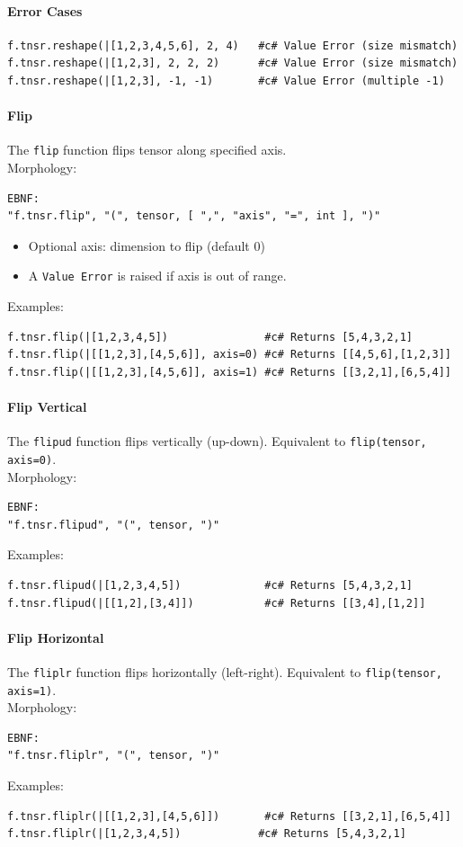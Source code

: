 \paragraph{Error Cases}
\begin{verbatim}
f.tnsr.reshape(|[1,2,3,4,5,6], 2, 4)   #c# Value Error (size mismatch)
f.tnsr.reshape(|[1,2,3], 2, 2, 2)      #c# Value Error (size mismatch)
f.tnsr.reshape(|[1,2,3], -1, -1)       #c# Value Error (multiple -1)
\end{verbatim}

\paragraph{Flip}
The \texttt{flip} function flips tensor along specified axis.\\
Morphology:
\begin{verbatim}
EBNF:
"f.tnsr.flip", "(", tensor, [ ",", "axis", "=", int ], ")"
\end{verbatim}
\begin{itemize}
\item Optional axis: dimension to flip (default 0)
\item A \texttt{Value Error} is raised if axis is out of range.
\end{itemize}
Examples:
\begin{verbatim}
f.tnsr.flip(|[1,2,3,4,5])               #c# Returns [5,4,3,2,1]
f.tnsr.flip(|[[1,2,3],[4,5,6]], axis=0) #c# Returns [[4,5,6],[1,2,3]]
f.tnsr.flip(|[[1,2,3],[4,5,6]], axis=1) #c# Returns [[3,2,1],[6,5,4]]
\end{verbatim}

\paragraph{Flip Vertical}
The \texttt{flipud} function flips vertically (up-down). Equivalent to \texttt{flip(tensor, axis=0)}.\\
Morphology:
\begin{verbatim}
EBNF:
"f.tnsr.flipud", "(", tensor, ")"
\end{verbatim}
Examples:
\begin{verbatim}
f.tnsr.flipud(|[1,2,3,4,5])             #c# Returns [5,4,3,2,1]
f.tnsr.flipud(|[[1,2],[3,4]])           #c# Returns [[3,4],[1,2]]
\end{verbatim}

\paragraph{Flip Horizontal}
The \texttt{fliplr} function flips horizontally (left-right). Equivalent to \texttt{flip(tensor, axis=1)}.\\
Morphology:
\begin{verbatim}
EBNF:
"f.tnsr.fliplr", "(", tensor, ")"
\end{verbatim}
Examples:
\begin{verbatim}
f.tnsr.fliplr(|[[1,2,3],[4,5,6]])       #c# Returns [[3,2,1],[6,5,4]]
f.tnsr.fliplr(|[1,2,3,4,5])            #c# Returns [5,4,3,2,1]
\end{verbatim}

